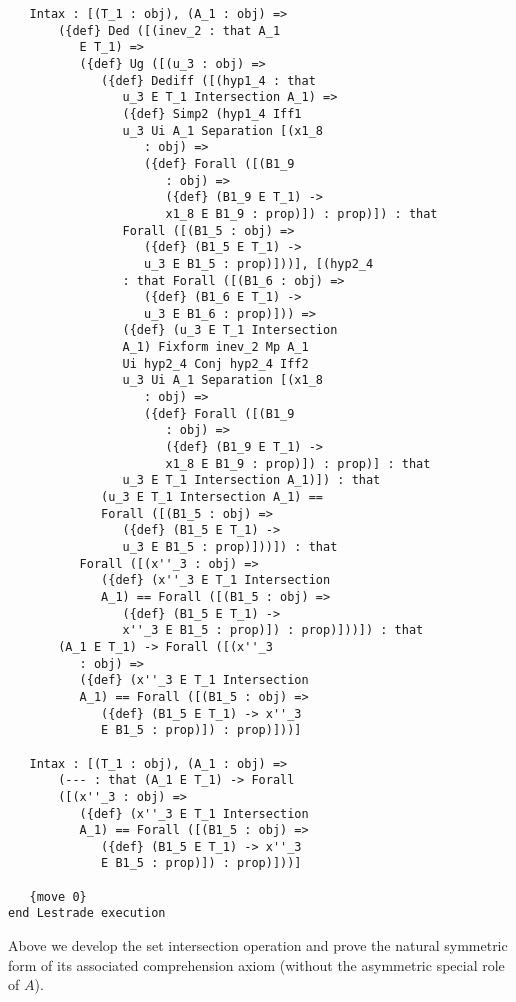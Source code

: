 \documentclass[12pt]{article}
\begin{document}
\begin{verbatim}
   Intax : [(T_1 : obj), (A_1 : obj) => 
       ({def} Ded ([(inev_2 : that A_1 
          E T_1) => 
          ({def} Ug ([(u_3 : obj) => 
             ({def} Dediff ([(hyp1_4 : that 
                u_3 E T_1 Intersection A_1) => 
                ({def} Simp2 (hyp1_4 Iff1 
                u_3 Ui A_1 Separation [(x1_8 
                   : obj) => 
                   ({def} Forall ([(B1_9 
                      : obj) => 
                      ({def} (B1_9 E T_1) -> 
                      x1_8 E B1_9 : prop)]) : prop)]) : that 
                Forall ([(B1_5 : obj) => 
                   ({def} (B1_5 E T_1) -> 
                   u_3 E B1_5 : prop)]))], [(hyp2_4 
                : that Forall ([(B1_6 : obj) => 
                   ({def} (B1_6 E T_1) -> 
                   u_3 E B1_6 : prop)])) => 
                ({def} (u_3 E T_1 Intersection 
                A_1) Fixform inev_2 Mp A_1 
                Ui hyp2_4 Conj hyp2_4 Iff2 
                u_3 Ui A_1 Separation [(x1_8 
                   : obj) => 
                   ({def} Forall ([(B1_9 
                      : obj) => 
                      ({def} (B1_9 E T_1) -> 
                      x1_8 E B1_9 : prop)]) : prop)] : that 
                u_3 E T_1 Intersection A_1)]) : that 
             (u_3 E T_1 Intersection A_1) == 
             Forall ([(B1_5 : obj) => 
                ({def} (B1_5 E T_1) -> 
                u_3 E B1_5 : prop)]))]) : that 
          Forall ([(x''_3 : obj) => 
             ({def} (x''_3 E T_1 Intersection 
             A_1) == Forall ([(B1_5 : obj) => 
                ({def} (B1_5 E T_1) -> 
                x''_3 E B1_5 : prop)]) : prop)]))]) : that 
       (A_1 E T_1) -> Forall ([(x''_3 
          : obj) => 
          ({def} (x''_3 E T_1 Intersection 
          A_1) == Forall ([(B1_5 : obj) => 
             ({def} (B1_5 E T_1) -> x''_3 
             E B1_5 : prop)]) : prop)]))]

   Intax : [(T_1 : obj), (A_1 : obj) => 
       (--- : that (A_1 E T_1) -> Forall 
       ([(x''_3 : obj) => 
          ({def} (x''_3 E T_1 Intersection 
          A_1) == Forall ([(B1_5 : obj) => 
             ({def} (B1_5 E T_1) -> x''_3 
             E B1_5 : prop)]) : prop)]))]

   {move 0}
end Lestrade execution
\end{verbatim}

Above we develop the set intersection operation and prove the natural symmetric form of its associated comprehension axiom (without the asymmetric special role of $A$).
\end{document}
